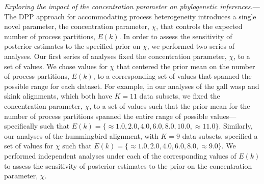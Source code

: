 \documentclass[11pt]{article}
\begin{document}

\bigskip
\noindent
{\it Exploring the impact of the concentration parameter on phylogenetic inferences.}---The DPP approach for accommodating process heterogeneity introduces a single novel parameter, the concentration parameter, $\chi$, that controls the expected number of process partitions, $E(k)$.
In order to assess the sensitivity of posterior estimates to the specified prior on $\chi$, we performed two series of analyses.
Our first series of analyses fixed the concentration parameter, $\chi$, to a set of values.
We chose values for $\chi$ that centered the prior mean on the number of process partitions, $E(k)$, to a corresponding set of values that spanned the possible range for each dataset.  
For example, in our analyses of the gall wasp and skink alignments, which both have $K = 11$ data subsets, we fixed the concentration parameter, $\chi$, to a set of values such that the prior mean for the number of process partitions spanned the entire range of possible values---specifically such that $E(k) = \{\approx 1.0, 2.0, 4.0, 6.0, 8.0, 10.0, \approx 11.0\}$.
Similarly, our analyses of the hummingbird alignment, with $K = 9$ data subsets, specified a set of values for $\chi$ such that $E(k) =\{\approx 1.0, 2.0, 4.0, 6.0, 8.0, \approx 9.0\}$.
We performed independent analyses under each of the corresponding values of $E(k)$ to assess the sensitivity of posterior estimates to the prior on the concentration parameter, $\chi$.
\end{document}
